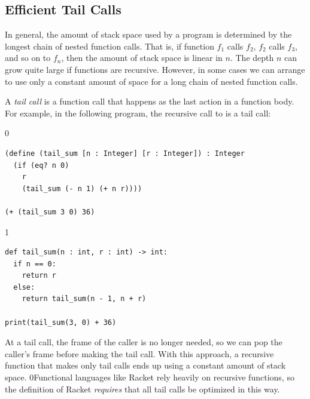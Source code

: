 \documentclass[7x10]{TimesAPriori_MIT}%
\def\racketEd{0}
\def\pythonEd{1}
\def\edition{1}
\newcommand{\racket}[1]{{\if\edition\racketEd{#1}\fi}}
\newcommand{\pythonColor}[0]{}
\numberwithin{theorem}{chapter}
\numberwithin{definition}{chapter}
\numberwithin{equation}{chapter}
\begin{document}

\subsection{Efficient Tail Calls}
\label{sec:tail-call}

In general, the amount of stack space used by a program is determined
by the longest chain of nested function calls. That is, if function
$f_1$ calls $f_2$, $f_2$ calls $f_3$, and so on to $f_n$, then the
amount of stack space is linear in $n$.  The depth $n$ can grow quite
large if functions are recursive. However, in some cases we can
arrange to use only a constant amount of space for a long chain of
nested function calls.

A \emph{tail call} is a function call that
happens as the last action in a function body.  For example, in the
following program, the recursive call to  is a tail
call:
\begin{center}
{\if\edition\racketEd  
\begin{lstlisting}
(define (tail_sum [n : Integer] [r : Integer]) : Integer
  (if (eq? n 0) 
    r
    (tail_sum (- n 1) (+ n r))))

(+ (tail_sum 3 0) 36)
\end{lstlisting}
\fi}
{\if\edition\pythonEd\pythonColor
\begin{lstlisting}
def tail_sum(n : int, r : int) -> int:
  if n == 0:
    return r
  else:
    return tail_sum(n - 1, n + r)

print(tail_sum(3, 0) + 36)
\end{lstlisting}
\fi}
\end{center}
At a tail call, the frame of the caller is no longer needed, so we can
pop the caller's frame before making the tail
call.  With this approach, a recursive function
that makes only tail calls ends up using a constant amount of stack
space.  \racket{Functional languages like Racket rely heavily on
  recursive functions, so the definition of Racket \emph{requires}
  that all tail calls be optimized in this way.}
\end{document}
